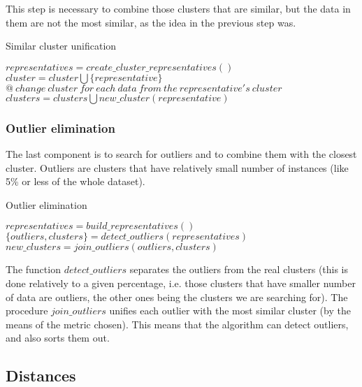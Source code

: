 \documentclass[conference]{IEEEtran}
\begin{document}
This step is necessary to combine those clusters that are similar, but the data in them are not the most similar, as the idea in the previous step was.

\scriptsize
\begin{algorithm}
\caption{Similar cluster unification}
\label{alg:unification}
\begin{algorithmic}[1]
\STATE $representatives = create{\_}cluster{\_}representatives()$
		\STATE $cluster = cluster \bigcup \{representative\}$
		\STATE $@ ~change~ cluster~ for~ each~ data~ from~ the~ representative's~ cluster$
	\ELSE
		\STATE $clusters = clusters \bigcup new{\_}cluster(representative)$
	\ENDIF
\ENDFOR
\end{algorithmic}
\end{algorithm}
\normalsize

\subsubsection{Outlier elimination}

The last component is to search for outliers and to combine them with the closest cluster. Outliers are clusters that have relatively small number of instances (like 5\% or less of the whole dataset).

\scriptsize
\begin{algorithm}
\caption{Outlier elimination}
\label{alg:outliers}
\begin{algorithmic}[1]
\STATE $representatives = build{\_}representatives()$
\STATE $\{outliers, clusters\} = detect{\_}outliers(representatives)$
\STATE $new{\_}clusters = join{\_}outliers(outliers,clusters)$
\end{algorithmic}
\end{algorithm}
\normalsize

The function $detect{\_}outliers$ separates the outliers from the real clusters (this is done relatively to a given percentage, i.e. those clusters that have smaller number of data are outliers, the other ones being the clusters we are searching for). The procedure $join{\_}outliers$ unifies each outlier with the most similar cluster (by the means of the metric chosen). This means that the algorithm can detect outliers, and also sorts them out.

\subsection{Distances}
\label{distances}
\end{document}
